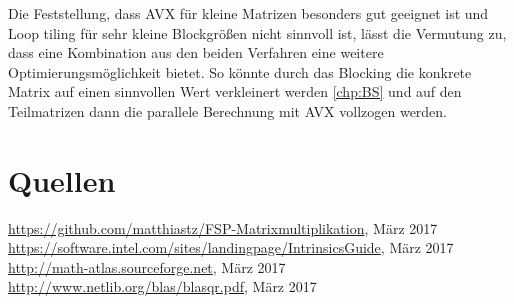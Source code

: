 \documentclass[a4paper,11pt]{scrartcl}
\begin{document}
Die Feststellung, dass AVX für kleine Matrizen besonders gut geeignet ist und 
Loop tiling für sehr kleine Blockgrößen nicht sinnvoll ist, lässt die Vermutung zu,
dass eine Kombination aus den beiden Verfahren eine weitere Optimierungsmöglichkeit 
bietet. So könnte durch das Blocking die konkrete Matrix auf einen sinnvollen Wert verkleinert
werden \ref{chp:BS} und auf den Teilmatrizen dann die parallele Berechnung mit AVX vollzogen werden.





\section{Quellen}
\begin{thebibliography}{9}

 \url{https://github.com/matthiastz/FSP-Matrixmultiplikation}, März 2017
 \url{https://software.intel.com/sites/landingpage/IntrinsicsGuide}, März 2017
 \url{http://math-atlas.sourceforge.net}, März 2017
 \url{http://www.netlib.org/blas/blasqr.pdf}, März 2017

\end{thebibliography}
\end{document}
